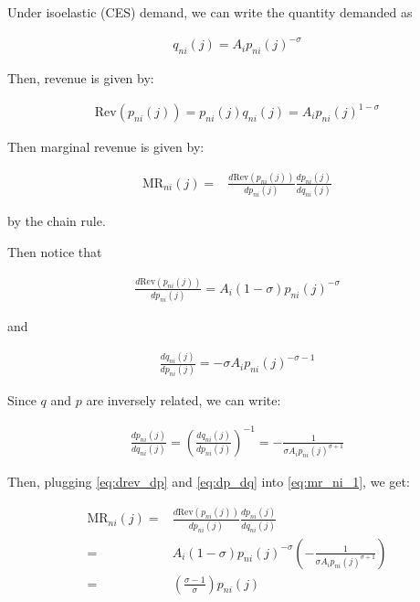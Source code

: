 \documentclass[10pt]{article}
\begin{document}
Under isoelastic (CES) demand, 
we can write the quantity demanded as

\begin{align}
    q_{ni}(j)=A_i p_{n i}(j)^{-\sigma} 
\end{align}

Then, revenue is given by:

\begin{align}
    \text{Rev}(p_{n i}(j)) = p_{n i}(j) q_{ni}(j) = A_i p_{n i}(j)^{1-\sigma}
\end{align}

Then marginal revenue is given by:

\begin{align}
    \text{MR}_{n i}(j) = &\frac{d \text{Rev}(p_{n i}(j))}{dp_{n i}(j)} \frac{d p_{n i}(j)}{d q_{ni}(j)} \label{eq:mr_ni_1}
\end{align}

by the chain rule.

Then notice that

\begin{align}
    \frac{d \text{Rev}(p_{n i}(j))}{dp_{n i}(j)} = A_i (1-\sigma) p_{n i}(j)^{-\sigma} \label{eq:drev_dp}
\end{align}

and 

\begin{align}
    \frac{d q_{ni}(j)}{d p_{n i}(j)} = -\sigma A_i p_{n i}(j)^{-\sigma-1}
\end{align}

Since $q$ and $p$ are inversely related,
we can write:

\begin{align}
    \frac{d p_{n i}(j)}{d q_{ni}(j)} = \left(\frac{d q_{ni}(j)}{d p_{n i}(j)}\right)^{-1} = -\frac{1}{\sigma A_i p_{n i}(j)^{\sigma+1}} \label{eq:dp_dq}
\end{align}

Then, plugging 
\eqref{eq:drev_dp} and \eqref{eq:dp_dq} into \eqref{eq:mr_ni_1}, we get:

\begin{align}
    \text{MR}_{n i}(j) = &\frac{d \text{Rev}(p_{n i}(j))}{dp_{n i}(j)} \frac{d p_{n i}(j)}{d q_{ni}(j)}  \\
    = & A_i (1-\sigma) p_{n i}(j)^{-\sigma} \left(-\frac{1}{\sigma A_i p_{n i}(j)^{\sigma+1}}\right) \\
    = & \left(\frac{\sigma - 1}{\sigma}\right) p_{n i}(j)
\end{align}

\end{document}
